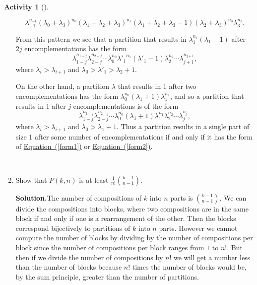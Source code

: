 \documentclass[10pt,]{book}
\theoremstyle{plain}
\theoremstyle{definition}
\newtheorem{activity}[project]{Activity}
\numberwithin{equation}{chapter}
\begin{document}
\begin{activity}[]
\begin{enumerate}[label=(\alph*)]
\begin{equation*}
\lambda_{-1}^{n_{-1}}(\lambda_0+\lambda_{3})^{n_0}(\lambda_1+
\lambda_2 +
\lambda_{3})^{n_1}(\lambda_1+\lambda_2 +\lambda_3-1)(\lambda_2+
\lambda_{3})^{n_3}
\lambda_3^{n_3}.
\end{equation*}
%
\par
From this pattern we see that a partition that results in \(\lambda_1^{n_1}(\lambda_1-1)\) after \(2j\) encomplementations has the form%
\begin{equation}
\lambda_{1-j}^{n_{1-j}}\lambda_{2-j}^{n_{2-j}}\cdots
\lambda_0^{n_0}
{\lambda'_1}^{n_1}
(\lambda'_1-1)\lambda_2^{n_2}\cdots
\lambda_{j+1}^{n_{j+1}},\label{form1}
\end{equation}
where \(\lambda_i>\lambda_{i+1}\) and \(\lambda_0>\lambda'_1>\lambda_2+1\).%
\par
On the other hand, a partition \(\lambda\) that results in \(1\) after two encomplementations has the form \(\lambda_0^{n_0}(\lambda_1+1)\lambda_1^{n_1}\), and so a partition that results in 1 after \(j\) encomplementations is of the form%
\begin{equation}
\lambda_{1-j}^{n_{1-j}}\lambda_{2-j}^{n_{2-j}}\cdots
\lambda_0^{n_0}(\lambda_1+1)\lambda_1^{n_1}\lambda_2^{n_2}\cdots
\lambda_j^{n_j},\label{form2}
\end{equation}
where \(\lambda_i>\lambda_{i+1}\) and \(\lambda_0>\lambda_1+1\). Thus a partition results in a single part of size 1 after some number of encomplementations if and only if it has the form of \hyperref[form1]{Equation~(\ref{form1})} or \hyperref[form2]{Equation~(\ref{form2})}.%

~\par
\item Show that \(P(k,n)\) is at least \(\frac{1}{n!}\binom{k-1}{n-1}\).%
\par\medskip\noindent%
\textbf{Solution.}\quad The number of compositions of \(k\) into \(n\) parts is \(\binom{k-1}{n-1}\). We can divide the compositions into blocks, where two compositions are in the same block if and only if one is a rearrangement of the other. Then the blocks correspond bijectively to partitions of \(k\) into \(n\) parts. However we cannot compute the number of blocks by dividing by the number of compositions per block since the number of compositions per block ranges from \(1\) to \(n!\).  But then if we divide the number of compositions by \(n!\) we will get a number less than the number of blocks because \(n!\) times the number of blocks would be, by the sum principle, greater than the number of partitions.%

\end{enumerate}
\end{activity}
\end{document}
